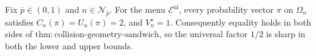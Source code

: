 Fix \(\bar p\in(0,1)\) and \(n\in\mathcal N_{\bar p}\).  For the menu \(\mathcal E^{\mathrm{nl}}\), every probability vector \(\pi\) on \(\Omega_n\) satisfies \(C_n(\pi)=U_n(\pi)=2\), and \(V_n^\star=1\).  Consequently equality holds in both sides of \(\mathrm{thm{:}collision\text{-}geometry\text{-}sandwich}\), so the universal factor \(1/2\) is sharp in both the lower and upper bounds.